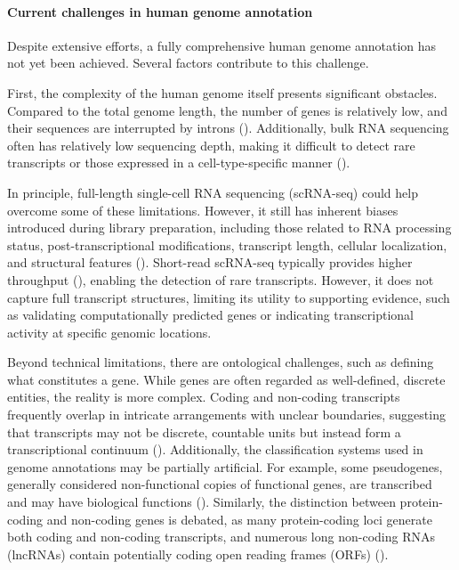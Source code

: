 \paragraph{Current challenges in human genome annotation}

Despite extensive efforts, a fully comprehensive human genome annotation has not yet been achieved.
Several factors contribute to this challenge.

First, the complexity of the human genome itself presents significant obstacles.
Compared to the total genome length, the number of genes is relatively low, and their sequences are interrupted by introns (\cite{Salzberg2019}).
Additionally, bulk RNA sequencing often has relatively low sequencing depth,
making it difficult to detect rare transcripts or those expressed in a cell-type-specific manner (\cite{Guigo2023}).

In principle, full-length single-cell RNA sequencing (scRNA-seq) could help overcome some of these limitations.
However, it still has inherent biases introduced during library preparation, including those related to RNA processing status,
post-transcriptional modifications, transcript length, cellular localization, and structural features (\cite{Guigo2023}).
Short-read scRNA-seq typically provides higher throughput (\cite{Heumos2023}), enabling the detection of rare transcripts.
However, it does not capture full transcript structures, limiting its utility to supporting evidence,
such as validating computationally predicted genes or indicating transcriptional activity at specific genomic locations.

Beyond technical limitations, there are ontological challenges, such as defining what constitutes a gene.
While genes are often regarded as well-defined, discrete entities, the reality is more complex.
Coding and non-coding transcripts frequently overlap in intricate arrangements with unclear boundaries,
suggesting that transcripts may not be discrete, countable units but instead form a transcriptional continuum (\cite{Salzberg2019}).
Additionally, the classification systems used in genome annotations may be partially artificial.
For example, some pseudogenes, generally considered non-functional copies of functional genes,
are transcribed and may have biological functions (\cite{Pei2012}).
Similarly, the distinction between protein-coding and non-coding genes is debated, as many protein-coding loci generate both coding
and non-coding transcripts, and numerous long non-coding RNAs (lncRNAs) contain potentially coding  open reading frames (ORFs) (\cite{Salzberg2019}).

